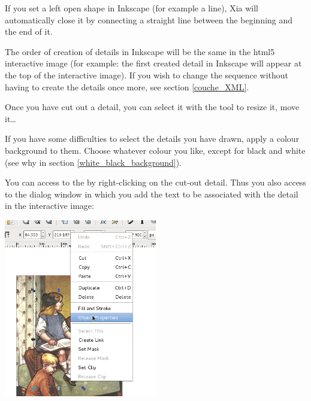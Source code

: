 \begin{alerte}
  If you set a left open shape in Inkscape (for example a line), Xia will automatically close it  by connecting a straight line between the beginning and the end of it.
\end{alerte}

\begin{alerte}
 The order of creation of details in Inkscape will be 
 the same in the html5 interactive image (for example: the first created detail in
Inkscape will appear at the top of the interactive image).
If you wish to change the sequence without having to create the details once more, see 
section \ref{couche_XML}.
\end{alerte}

Once you have cut out a detail, you can select it with the tool  
 to resize it, move it\ldots

\begin{astuce}
If you have some difficulties to select the details you have drawn,
apply a colour background to them. Choose whatever colour you like, except for black and white (see why in section \ref{white_black_background}).
\end{astuce}


You can access to the  by right-clicking on the cut-out detail.
Thus you also access to the dialog window in which you add the text to be associated with the 
detail in the interactive image:\\

\begin{center}
 \includegraphics[width=0.5\textwidth]{./images/proprietes_objet}\\ 
\end{center}

